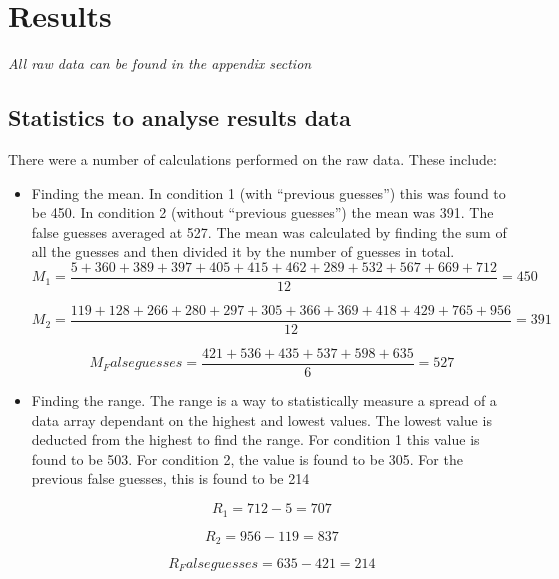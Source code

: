 \documentclass{report}
\begin{document}
\section{Results}
\textit{All raw data can be found in the appendix section}
\subsection{Statistics to analyse results data}
There were a number of calculations performed on the raw data. These include:
\begin{itemize}
\item Finding the mean. In condition 1 (with “previous guesses”) this was found to be 450. In condition 2 (without “previous guesses”) the mean was 391. The false guesses averaged at 527. The mean was calculated by finding the sum of all the guesses and then divided it by the number of guesses in total.
\begin{displaymath}
M_1 = \frac{5+360+389+397+405+415+462+289+532+567+669+712}{12} = 450
\end{displaymath}

\begin{displaymath}
M_2 = \frac{119+128+266+280+297+305+366+369+418+429+765+956}{12} = 391
\end{displaymath}

\begin{displaymath}
M_Falseguesses = \frac{421+536+435+537+598+635}{6} = 527
\end{displaymath}

\item Finding the range. The range is a way to statistically measure a spread of a data array dependant on the highest and lowest values. The lowest value is deducted from the highest to find the range. For condition 1 this value is found to be 503. For condition 2, the value is found to be 305. For the previous false guesses, this is found to be 214

\begin{displaymath}
R_1 = 712-5 = 707
\end{displaymath}

\begin{displaymath}
R_2 = 956 - 119 = 837
\end{displaymath}

\begin{displaymath}
R_Falseguesses = 635-421 = 214
\end{displaymath}
\end{itemize}
\end{document}
